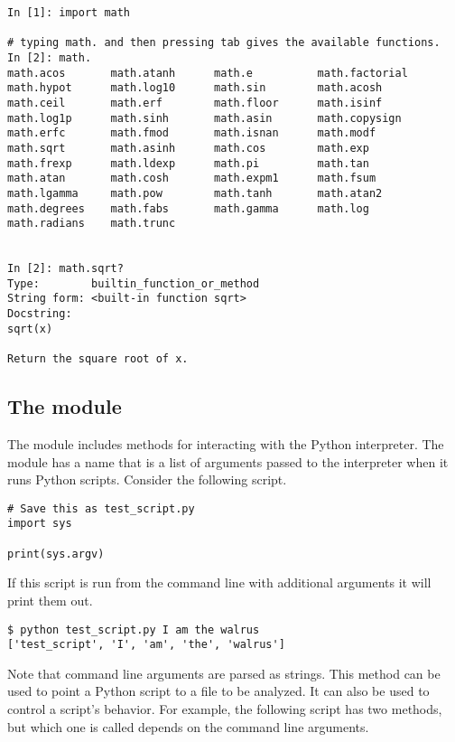 \begin{lstlisting}
In [1]: import math

# typing math. and then pressing tab gives the available functions.
In [2]: math.
math.acos       math.atanh      math.e          math.factorial  
math.hypot      math.log10      math.sin        math.acosh      
math.ceil       math.erf        math.floor      math.isinf      
math.log1p      math.sinh       math.asin       math.copysign   
math.erfc       math.fmod       math.isnan      math.modf       
math.sqrt       math.asinh      math.cos        math.exp        
math.frexp      math.ldexp      math.pi         math.tan        
math.atan       math.cosh       math.expm1      math.fsum       
math.lgamma     math.pow        math.tanh       math.atan2      
math.degrees    math.fabs       math.gamma      math.log        
math.radians    math.trunc


In [2]: math.sqrt?
Type:        builtin_function_or_method
String form: <built-in function sqrt>
Docstring:
sqrt(x)

Return the square root of x.
\end{lstlisting}

\subsection*{The  module}

The  module includes methods for interacting with the Python interpreter.
The module has a name  that is a list of arguments passed to the interpreter when it runs Python scripts.
Consider the following script.

\begin{lstlisting}
# Save this as test_script.py
import sys

print(sys.argv)
\end{lstlisting}

If this script is run from the command line with additional arguments it will print them out.

\begin{lstlisting}
$ python test_script.py I am the walrus
['test_script', 'I', 'am', 'the', 'walrus']
\end{lstlisting}

Note that command line arguments are parsed as strings.
This method can be used to point a Python script to a file to be analyzed.
It can also be used to control a script's behavior.
For example, the following script has two methods, but which one is called depends on the command line arguments.

